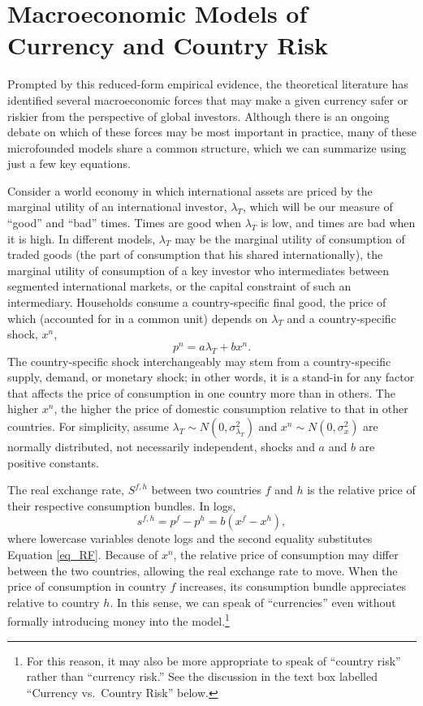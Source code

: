 \documentclass{ar-1col}
\begin{document}
\section{Macroeconomic Models of Currency and Country Risk\label{sec_theory}}

Prompted by this reduced-form empirical evidence, the theoretical literature has identified several macroeconomic forces that may make a given currency safer or riskier from the perspective of global investors. Although there is an ongoing debate on which of these forces may be most important in practice, many of these microfounded models share a common structure, which we can summarize using just a few key equations.

Consider a world economy in which international assets are priced by the marginal utility of an international investor, $\lambda_T$, which will be our measure of ``good'' and ``bad'' times. Times are good when $\lambda_T$ is low, and times are bad when it is high. In different models, $\lambda_T$ may be the marginal utility of consumption of traded goods (the part of consumption that his shared internationally), the marginal utility of consumption of a key investor who intermediates between segmented international markets, or the capital constraint of such an intermediary. Households consume a country-specific final good, the price of which (accounted for in a common unit) depends on $\lambda_T$ and a country-specific shock, $x^n$,
\begin{equation}
  p^{n} = a\lambda_{T} + b x^{n}.  
  \label{eq_RF}
\end{equation}%
The country-specific shock interchangeably may stem from a country-specific supply, demand, or monetary shock; in other words, it is a stand-in for any factor that affects the price of consumption in one country more than in others. The higher $x^{n}$, the higher the price of domestic consumption relative to that in other countries. For simplicity, assume $\lambda _{T}\sim N(0,\sigma^2_{\lambda_{T}})$ and $x^{n} \sim N(0,\sigma^2_x) $ are normally distributed, not necessarily independent, shocks and $a$ and $b$ are positive constants.

The real exchange rate, $S^{f, h}$ between two countries $f$ and $h$ is the relative price of their respective consumption bundles. In logs,
\begin{equation}
  s^{f,h} 
  = p^f - p^h 
  = b(x^f - x^h),
\label{eq_RER}
\end{equation}
where lowercase variables denote logs and the second equality substitutes Equation \eqref{eq_RF}. Because of $x^{n}$, the relative price of consumption may differ between the two countries, allowing the real exchange rate to move. When the price of consumption in country $f$ increases, its consumption bundle appreciates relative to country $h$. In this sense, we can speak of ``currencies'' even without formally introducing money into the model.\footnote{For this reason, it may also be more appropriate to speak of ``country risk'' rather than ``currency risk.'' See the discussion in the text box labelled ``Currency vs.~Country Risk'' below. }
\end{document}
